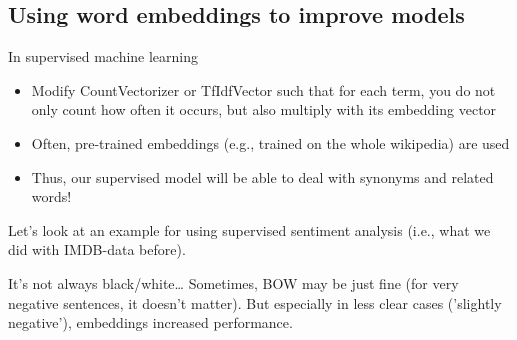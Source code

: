 


\subsection[Improving models]{Using word embeddings to improve models}

\begin{frame}{In supervised machine learning}
  \begin{itemize}[<+->]
  \item Modify CountVectorizer or TfIdfVector such that for each term, you do not only count how often it occurs, but also multiply with its embedding vector
  \item Often, pre-trained embeddings (e.g., trained on the whole wikipedia) are used
  \item Thus, our supervised model will be able to deal with synonyms and related words!
  \end{itemize}
  
  \pause 
  Let's look at an example for using supervised sentiment analysis (i.e., what we did with IMDB-data before).
  
	
\end{frame}



\begin{frame}[plain]
	

  \cite{Rudkowsky2018a}
\end{frame}


\begin{frame}{It's not always black/white\ldots}
	Sometimes, BOW may be just fine (for very negative sentences, it doesn't matter). But especially in less clear cases ('slightly negative'), embeddings increased performance.
	
	\vfill
	\cite{Rudkowsky2018a}
\end{frame}



